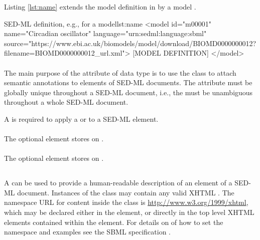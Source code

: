 \begin{blockChanged}
Listing \ref{lst:name} extends the model definition in  by a model .

\begin{myXmlLst}{SED-ML  definition, e.g., for a model}{lst:name}
<model id="m00001" name="Circadian oscillator" language="urn:sedml:language:sbml"
        source="https://www.ebi.ac.uk/biomodels/model/download/BIOMD0000000012?filename=BIOMD0000000012_url.xml">
	[MODEL DEFINITION]
</model>
\end{myXmlLst}
\end{blockChanged}



\paragraph*{}
\label{sec:metaid}
The main purpose of the  attribute of data type  is to use the \Annotation class to attach semantic annotations to elements of SED-ML documents. The  attribute must be globally unique throughout a SED-ML document, i.e., the  must be unambiguous throughout a whole SED-ML document.

A  is required to apply a \Notes or \Annotation to a SED-ML element.

\paragraph*{}
\label{sec:notesElement}
The optional  element stores \Notes on \SedBase.

\paragraph*{}
\label{sec:annotationElement}
The optional  element stores \Annotation on \SedBase.

\subsection{}
\label{class:notes}
A  can be used to provide a human-readable description of an element of a SED-ML document. Instances of the  class may contain any valid XHTML \citep{P+02}. The namespace URL for  content inside the \Notes class is \url{http://www.w3.org/1999/xhtml}, which may be declared either in the \SedML element, or directly in the top level XHTML elements contained within the \hyperref[sec:notesElement]{} element. For details on of how to set the namespace and examples see the SBML specification \citep{HBH+10}.

